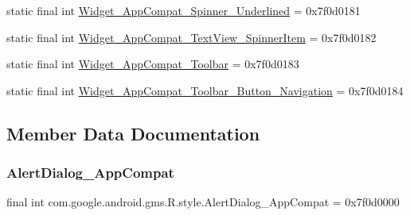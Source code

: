 \begin{DoxyCompactItemize}
static final int \mbox{\hyperlink{classcom_1_1google_1_1android_1_1gms_1_1R_1_1style_a3818660383c46c04e6f856d3a28a6a9a}{Widget\+\_\+\+App\+Compat\+\_\+\+Spinner\+\_\+\+Underlined}} = 0x7f0d0181
\item 
static final int \mbox{\hyperlink{classcom_1_1google_1_1android_1_1gms_1_1R_1_1style_afe875509174d976a2cf197577180543c}{Widget\+\_\+\+App\+Compat\+\_\+\+Text\+View\+\_\+\+Spinner\+Item}} = 0x7f0d0182
\item 
static final int \mbox{\hyperlink{classcom_1_1google_1_1android_1_1gms_1_1R_1_1style_ab86035a2017ead4209f881c91518bff7}{Widget\+\_\+\+App\+Compat\+\_\+\+Toolbar}} = 0x7f0d0183
\item 
static final int \mbox{\hyperlink{classcom_1_1google_1_1android_1_1gms_1_1R_1_1style_aef2f545e87aa33e9c37b8e5572ebeef5}{Widget\+\_\+\+App\+Compat\+\_\+\+Toolbar\+\_\+\+Button\+\_\+\+Navigation}} = 0x7f0d0184
\end{DoxyCompactItemize}


\subsection{Member Data Documentation}
\mbox{\label{classcom_1_1google_1_1android_1_1gms_1_1R_1_1style_a655dde196110073187ff00b97ed4ad4a}} 
\subsubsection{\texorpdfstring{Alert\+Dialog\+\_\+\+App\+Compat}{AlertDialog\_AppCompat}}
{\footnotesize\ttfamily final int com.\+google.\+android.\+gms.\+R.\+style.\+Alert\+Dialog\+\_\+\+App\+Compat = 0x7f0d0000\hspace{0.3cm}{\ttfamily [static]}}

\mbox{\label{classcom_1_1google_1_1android_1_1gms_1_1R_1_1style_afb60526c8ffabe0efffdf437fb9e2977}} 
